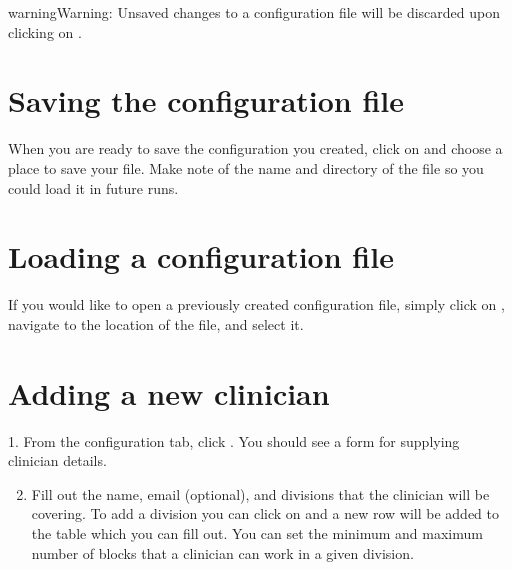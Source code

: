 \documentclass[letterpaper,10pt,english]{sphinxmanual}
\begin{document}
\begin{figure}[H]
\centering
{}\end{figure}

\begin{sphinxadmonition}{warning}{Warning:}
Unsaved changes to a configuration file will be discarded upon clicking
on .
\end{sphinxadmonition}


\section{Saving the configuration file}
\label{\detokenize{manual:saving-the-configuration-file}}
When you are ready to save the configuration you created, click on
 and choose a place to save your file. Make note of the name
and directory of the file so you could load it in future runs.

\begin{figure}[H]
\centering
{}\end{figure}


\section{Loading a configuration file}
\label{\detokenize{manual:loading-a-configuration-file}}
If you would like to open a previously created configuration file, simply
click on , navigate to the location of the file,
and select it.

\begin{figure}[H]
\centering
{}\end{figure}


\section{Adding a new clinician}
\label{\detokenize{manual:adding-a-new-clinician}}\label{\detokenize{manual:id2}}
1. From the configuration tab, click . You should see a
form for supplying clinician details.

\begin{figure}[H]
\centering
{}\end{figure}
\begin{enumerate}
\setcounter{enumi}{1}
\item {} 
Fill out the name, email (optional), and divisions that the clinician
will be covering. To add a division you can click on  and a new row
will be added to the table which you can fill out. You can set the minimum
and maximum number of blocks that a clinician can work in a given division.

\end{enumerate}
\end{document}
